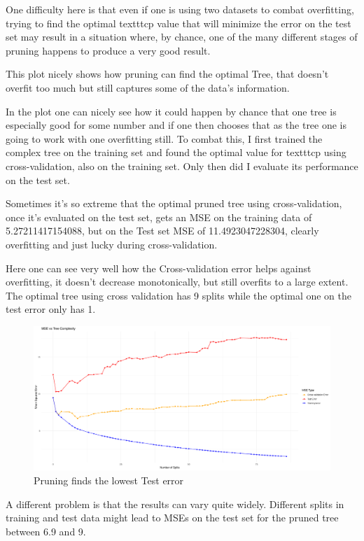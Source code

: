 \documentclass[12pt]{article}
\begin{document}
One difficulty here is that even if one is using two datasets to combat overfitting, trying to find the optimal texttt{cp} value that will minimize the error on the test set may result in a situation where, by chance, one of the many different stages of pruning happens to produce a very good result.

This plot nicely shows how pruning can find the optimal Tree, that doesn't overfit too much but still captures some of the data's information.

In the  plot one can nicely see how it could happen by chance that one tree is especially good for some number and if one then chooses that as the tree one is going to work with one overfitting still.
To combat this, I first trained the complex tree on the training set and found the optimal value for texttt{cp} using cross-validation, also on the training set. Only then did I evaluate its performance on the test set.

Sometimes it's so extreme that the optimal pruned tree using cross-validation, once it's evaluated on the test set, gets an MSE on the training data of 5.27211417154088, but on the Test set MSE of 11.4923047228304, clearly overfitting and just lucky during cross-validation.

Here one can see very well how the Cross-validation error helps against overfitting, it doesn't decrease monotonically, but still overfits to a large extent. The optimal tree using cross validation has 9 splits while the optimal one on the test error only has 1.

\begin{figure}
    \centering
    \includegraphics[scale=0.30]{triple_pruning_plot.pdf}
    \caption{Pruning finds the lowest Test error}
\end{figure}

A different problem is that the results can vary quite widely. Different splits in training and test data might lead to MSEs on the test set for the pruned tree between 6.9 and 9.
\end{document}
